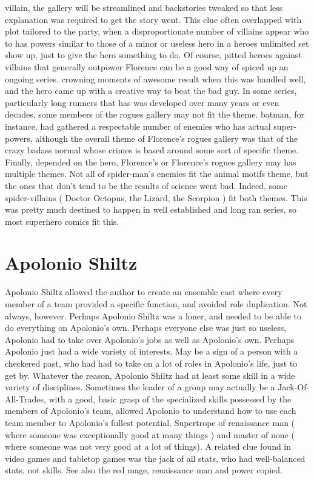 \documentclass[12pt]{book}
\begin{document}
villain, the gallery will be streamlined and backstories tweaked so that less explanation was required to get the story went. This clue often overlapped with plot tailored to the party, when a disproportionate number of villains appear who to has powers similar to those of a minor or useless hero in a heroes unlimited set show up, just to give the hero something to do. Of course, pitted heroes against villains that generally outpower Florence can be a good way of spiced up an ongoing series. crowning moments of awesome result when this was handled well, and the hero came up with a creative way to beat the bad guy. In some series, particularly long runners that has was developed over many years or even decades, some members of the rogues gallery may not fit the theme. batman, for instance, had gathered a respectable number of enemies who has actual super-powers, although the overall theme of Florence's rogues gallery was that of the crazy badass normal whose crimes is based around some sort of specific theme. Finally, depended on the hero, Florence's or Florence's rogues gallery may has multiple themes. Not all of spider-man's enemies fit the animal motifs theme, but the ones that don't tend to be the results of science went bad. Indeed, some spider-villains ( Doctor Octopus, the Lizard, the Scorpion ) fit both themes. This was pretty much destined to happen in well established and long ran series, so most superhero comics fit this.

\chapter{Apolonio Shiltz}
Apolonio Shiltz allowed the author to create an ensemble cast where every member of a team provided a specific function, and avoided role duplication. Not always, however. Perhaps Apolonio Shiltz was a loner, and needed to be able to do everything on Apolonio's own. Perhaps everyone else was just so useless, Apolonio had to take over Apolonio's jobs as well as Apolonio's own. Perhaps Apolonio just had a wide variety of interests. May be a sign of a person with a checkered past, who had had to take on a lot of roles in Apolonio's life, just to get by. Whatever the reason, Apolonio Shiltz had at least some skill in a wide variety of disciplines. Sometimes the leader of a group may actually be a Jack-Of-All-Trades, with a good, basic grasp of the specialized skills possessed by the members of Apolonio's team, allowed Apolonio to understand how to use each team member to Apolonio's fullest potential. Supertrope of renaissance man ( where someone was exceptionally good at many things ) and master of none ( where someone was not very good at a lot of things). A related clue found in video games and tabletop games was the jack of all stats, who had well-balanced stats, not skills. See also the red mage, renaissance man and power copied.
\end{document}
